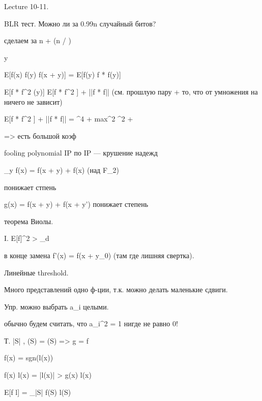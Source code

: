 Lecture 10-11.


BLR тест. Можно ли за 0.99n случайный битов?

сделаем за n + \log(n / \eps)

y ~ \phi

\teta \le E[f(x) f(y) f(x + y)] = E[f(y) f * f(y)] \le {} 

E[f * f^2 (y)] \le E[f * f^2 ] + ||f * f|| \eps  (см. прошлую пару + то, что от умножения на \chi ничего не зависит)

E[f * f^2 ] + ||f * f|| \eps = \sum {}^4 + \eps \le  max{^2} \sum {}^2 + \eps

=> есть большой коэф


fooling polynomial
IP по IP --- крушение надежд

\Delta_y f(x) = f(x + y) + f(x) (над F_2)

\Delta понижает стпень

g(x) = f(x + y) + f(x + y') понижает степень


теорема Виолы.

I. E[f]^2 > \eps_d

в конце замена f'(x) = f(x + y_0) (там где лишняя свертка).





Линейные threshold.

Много представлений одно ф-ции, т.к. можно делать маленькие сдвиги.

Упр. можно выбрать a_i целыми.

обычно будем считать, что \sum a_i^2 = 1
нигде не равно 0!


Т. |S| , (S) = (S) => g = f

f(x) = sgn(l(x))

f(x) l(x) = |l(x)| > g(x) l(x)

E[f l] = \sum_{|S| } f(S) l(S)
